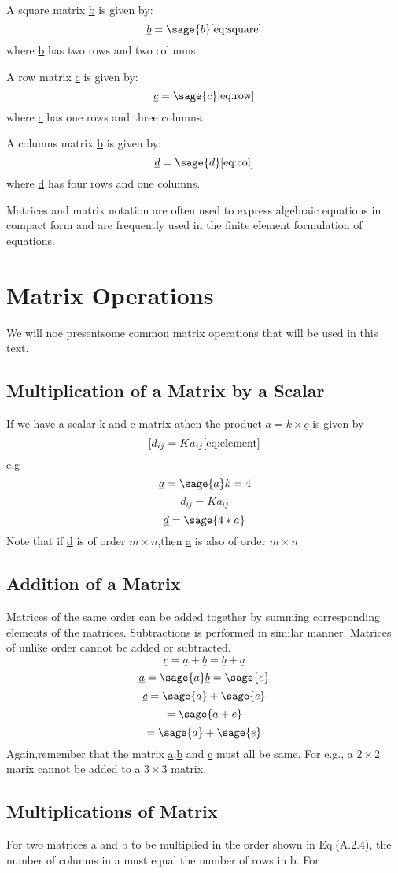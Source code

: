 \documentclass[12pt]{report}
\begin{document}
A square matrix \underline{b} is given by:
$$\underline{b}=\sage{b}
\label{eq:square}
\ref{eq:square}
$$
where \underline{b} has two rows and two columns.

A row matrix \underline{c} is given by:
$$\underline{c}=\sage{c}
\label{eq:row}
\ref{eq:row}
$$
where \underline{c} has one rows and three columns.

A columns matrix \underline{b} is given by:
$$\underline{d}=\sage{d}
\label{eq:col}
\ref{eq:col}
$$
where \underline{d} has four rows and one columns.

Matrices and matrix notation are often used to express algebraic equations in compact form and are frequently used in the finite element formulation of equations.
\section{Matrix Operations}
We will noe presentsome common matrix operations that will be used in this text.
\subsection{Multiplication of a Matrix by a Scalar}
If we have a scalar k and \underline{c} matrix athen the product $a = k \times \underline{c} $ is given by
$$[d_{{ij}} = Ka_{{ij}} \label{eq:element}
\ref{eq:element}$$
e.g
$$
\underline{a}=\sage{a}
k= 4$$
$$d_{{ij}} = Ka_{{ij}}$$
$$\underline{d} = \sage{4*a}$$
Note that if \underline{d} is of order $ m \times n $,then \underline{a} is also of order $ m \times n $
\subsection{Addition of a Matrix}
Matrices of the same order can be added together by summing corresponding elements of the matrices. Subtractions is performed in similar manner. Matrices of unlike order cannot be added or subtracted.
\[ \underline{c}=\underline{a}+\underline{b}= \underline{b}+\underline{a} \]
$$\underline{a}=\sage{a}
\underline{b}=\sage{e}$$
$$\underline{c}=\sage{a} + \sage{e}$$
$$=\sage{a+e}$$
$$=\sage{a} + \sage{e}$$
Again,remember that the matrix \underline{a},\underline{b} and \underline{c} must all be same. For e.g., a $ 2 \times 2 $ marix cannot be added to a $ 3 \times 3 $ matrix.

\subsection{Multiplications of Matrix}
For two matrices a and b to be multiplied in the order shown in Eq.(A.2.4), the number of columns in a must equal the number of rows in b. For
\end{document}
